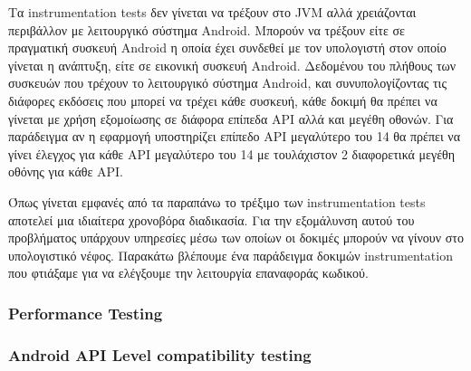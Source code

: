 		Τα instrumentation tests δεν γίνεται να τρέξουν στο JVM αλλά χρειάζονται περιβάλλον με λειτουργικό σύστημα Android. Μπορούν να τρέξουν είτε σε πραγματική συσκευή Android η οποία έχει συνδεθεί με τον υπολογιστή στον οποίο γίνεται η ανάπτυξη, είτε σε εικονική συσκευή Android. Δεδομένου του πλήθους των συσκευών που τρέχουν το λειτουργικό σύστημα Android, και συνυπολογίζοντας τις διάφορες εκδόσεις που μπορεί να τρέχει κάθε συσκευή, κάθε δοκιμή θα πρέπει να γίνεται με χρήση εξομοίωσης σε διάφορα επίπεδα API αλλά και μεγέθη οθονών. Για παράδειγμα αν η εφαρμογή υποστηρίζει επίπεδο API μεγαλύτερο του 14 θα πρέπει να γίνει έλεγχος για κάθε API μεγαλύτερο του 14 με τουλάχιστον 2 διαφορετικά μεγέθη οθόνης για κάθε API. 
		
		Όπως γίνεται εμφανές από τα παραπάνω το τρέξιμο των instrumentation tests αποτελεί μια ιδιαίτερα χρονοβόρα διαδικασία. Για την εξομάλυνση αυτού του προβλήματος υπάρχουν υπηρεσίες μέσω των οποίων οι δοκιμές μπορούν να γίνουν στο υπολογιστικό νέφος. Παρακάτω βλέπουμε ένα παράδειγμα δοκιμών instrumentation που φτιάξαμε για να ελέγξουμε την λειτουργία επαναφοράς κωδικού.
		
		\subsubsection{Performance Testing}
		\subsubsection{Android API Level compatibility testing}


